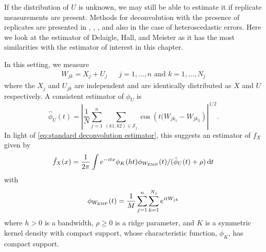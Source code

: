 	If the distribution of $U$ is unknown, we may still be able to estimate it if replicate measurements are present. Methods for deconvolution with the presence of replicates are presented in \cite{Li1998-mj}, \cite{Lin2006-mm}, \cite{Delaigle2008-hl}, and also \cite{McIntyre2011-fg} in the case of heteroscedastic errors. Here we look at the estimator of Delaigle, Hall, and Meister \cite{Delaigle2008-hl} as it has the most similarities with the estimator of interest in this chapter.

	In this setting, we measure
	\begin{align}
		W_{jk} = X_j + U_j && j = 1, \dots, n \text{ and } k = 1, \dots, N_j
	\end{align}
	where the $X_j$ and $U_{jk}$ are independent and are identically distributed as $X$ and $U$ respectively. A consistent estimator of $\phi_U$ is
	\begin{equation}
		\hat{\phi}_U(t) = \left|\frac{1}{N} \sum_{j = 1}^n \sum_{(k1, k2) \in \mathscr{S}_j} \cos \left(t (W_{jk_1} - W_{jk_2}\right)\right|^{1/2}.
	\end{equation}
	In light of \eqref{eq:standard deconvolution estimator}, this suggests an estimator of $f_X$ given by 
	\begin{equation}
	\label{eq:replicates estimator}
		\hat{f}_X(x) = \frac{1}{2\pi} \int e^{-itx} \phi_K(ht) \phi_{W_\mathrm{EMP}}(t)  / (\hat{\phi}_U(t) + \rho )\, \mathrm{d} t
	\end{equation}
	with
	\begin{equation}
		\phi_{W_\mathrm{EMP}}(t) = \frac{1}{M} \sum_{j = 1}^n \sum_{k= 1}^{N_j} e^{i t W_{jk}}
	\end{equation}
	where
	$h > 0$ is a bandwidth, $\rho \geq 0$ is a ridge parameter, and $K$ is a symmetric kernel density with compact support, whose characteristic function, $\phi_K$, has compact support.

